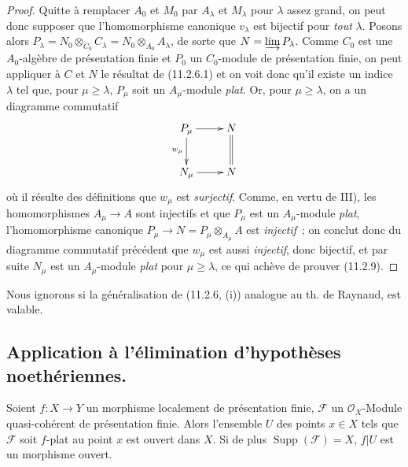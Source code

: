 \begin{proof}
Quitte à remplacer $A_0$ et $M_0$ par $A_\lambda$ et $M_\lambda$ pour
$\lambda$ assez grand, on peut donc supposer que l'homomorphisme canonique
$v_\lambda$ est bijectif pour \emph{tout} $\lambda$. Posons alors
$P_\lambda=N_0\otimes_{C_0}C_\lambda=N_0\otimes_{A_0}A_\lambda$, de sorte que
$N=\varinjlim P_\lambda$. Comme $C_0$ est une $A_0$-algèbre de présentation
finie et $P_0$ un $C_0$-module de présentation finie, on peut appliquer à
$C$ et $N$ le résultat de (11.2.6.1) et on voit donc qu'il existe un indice
$\lambda$ tel que, pour $\mu\geq\lambda$, $P_\mu$ soit un $A_\mu$-module
\emph{plat}. Or, pour $\mu\geq\lambda$, on a un diagramme commutatif
\[
\xymatrix{
P_\mu \ar[r] \ar[d]_{w_\mu} & N \ar@{=}[d] \\
N_\mu \ar[r] & N
}
\]
où il résulte des définitions que $w_\mu$ est \emph{surjectif}. Comme, en
vertu de III), les homomorphismes $A_\mu\to A$ sont injectifs et que $P_\mu$
est un $A_\mu$-module \emph{plat}, l'homomorphisme canonique
$P_\mu\to N=P_\mu\otimes_{A_\mu}A$ est \emph{injectif}~; on conclut donc du
diagramme commutatif précédent que $w_\mu$ est aussi \emph{injectif}, donc bijectif,
et par suite $N_\mu$ est un $A_\mu$-module \emph{plat} pour $\mu\geq\lambda$, ce qui
achève de prouver (11.2.9).
\end{proof}

\begin{remark}[11.2.10]
\label{IV.11.2.10-fr}
Nous ignorons si la généralisation de (11.2.6, (i)) analogue au th. de Raynaud,
est valable.
\end{remark}

\subsection{Application à l'élimination d'hypothèses noethériennes.}
\label{subsection:IV.11.3-fr}
\label{IV.11.3-fr}

\begin{theorem}[11.3.1]
\label{IV.11.3.1-fr}
Soient $f:X\to Y$ un morphisme localement de présentation finie,
$\mathcal F$ un $\mathcal O_X$-Module quasi-cohérent de présentation finie.
Alors l'ensemble $U$ des points $x\in X$ tels que $\mathcal F$ soit $f$-plat
au point $x$ est ouvert dans $X$. Si de plus $\operatorname{Supp}(\mathcal F)=X$,
$f|U$ est un morphisme ouvert.
\end{theorem}

